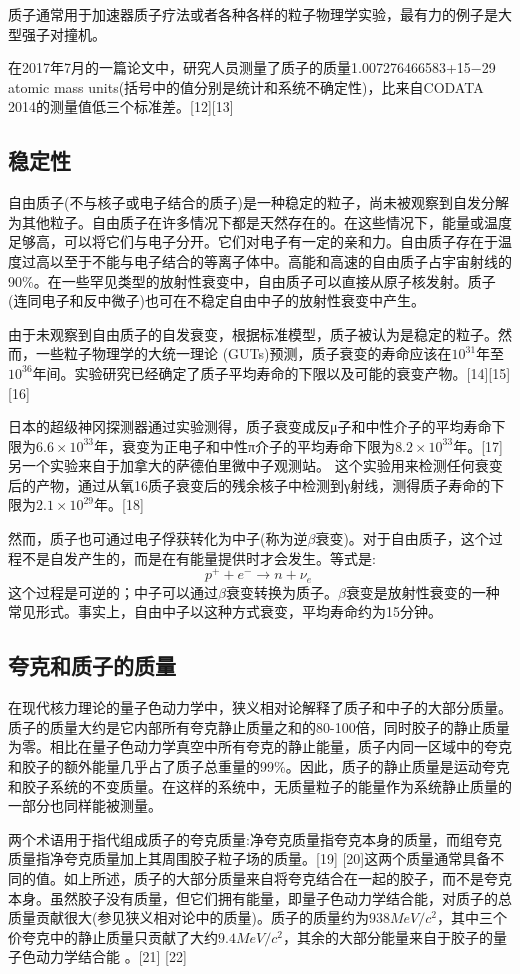 质子通常用于加速器质子疗法或者各种各样的粒子物理学实验，最有力的例子是大型强子对撞机。

在2017年7月的一篇论文中，研究人员测量了质子的质量1.007276466583+15−29 atomic mass units(括号中的值分别是统计和系统不确定性)，比来自CODATA 2014的测量值低三个标准差。[12][13]

\subsection{稳定性}
自由质子(不与核子或电子结合的质子)是一种稳定的粒子，尚未被观察到自发分解为其他粒子。自由质子在许多情况下都是天然存在的。在这些情况下，能量或温度足够高，可以将它们与电子分开。它们对电子有一定的亲和力。自由质子存在于温度过高以至于不能与电子结合的等离子体中。高能和高速的自由质子占宇宙射线的90\%。在一些罕见类型的放射性衰变中，自由质子可以直接从原子核发射。质子(连同电子和反中微子)也可在不稳定自由中子的放射性衰变中产生。

由于未观察到自由质子的自发衰变，根据标准模型，质子被认为是稳定的粒子。然而，一些粒子物理学的大统一理论 (GUTs)预测，质子衰变的寿命应该在$10^{31}$年至$10^{36}$年间。实验研究已经确定了质子平均寿命的下限以及可能的衰变产物。[14][15][16]

日本的超级神冈探测器通过实验测得，质子衰变成反μ子和中性介子的平均寿命下限为$6.6\times10^{33}$年，衰变为正电子和中性π介子的平均寿命下限为$8.2\times10^{33}$年。[17]另一个实验来自于加拿大的萨德伯里微中子观测站。 这个实验用来检测任何衰变后的产物，通过从氧16质子衰变后的残余核子中检测到γ射线，测得质子寿命的下限为$2.1\times10^{29}$年。[18]

然而，质子也可通过电子俘获转化为中子(称为逆$\beta$衰变)。对于自由质子，这个过程不是自发产生的，而是在有能量提供时才会发生。等式是:
$$p^+ + e^- \to n +\nu_e~$$
这个过程是可逆的；中子可以通过$\beta$衰变转换为质子。$\beta$衰变是放射性衰变的一种常见形式。事实上，自由中子以这种方式衰变，平均寿命约为15分钟。

\subsection{夸克和质子的质量}
在现代核力理论的量子色动力学中，狭义相对论解释了质子和中子的大部分质量。质子的质量大约是它内部所有夸克静止质量之和的80-100倍，同时胶子的静止质量为零。相比在量子色动力学真空中所有夸克的静止能量，质子内同一区域中的夸克和胶子的额外能量几乎占了质子总重量的99\%。因此，质子的静止质量是运动夸克和胶子系统的不变质量。在这样的系统中，无质量粒子的能量作为系统静止质量的一部分也同样能被测量。

两个术语用于指代组成质子的夸克质量:净夸克质量指夸克本身的质量，而组夸克质量指净夸克质量加上其周围胶子粒子场的质量。[19] [20]这两个质量通常具备不同的值。如上所述，质子的大部分质量来自将夸克结合在一起的胶子，而不是夸克本身。虽然胶子没有质量，但它们拥有能量，即量子色动力学结合能，对质子的总质量贡献很大(参见狭义相对论中的质量)。质子的质量约为$938 MeV/c^2$，其中三个价夸克中的静止质量只贡献了大约$9.4 MeV/c^2$，其余的大部分能量来自于胶子的量子色动力学结合能 。[21] [22]

